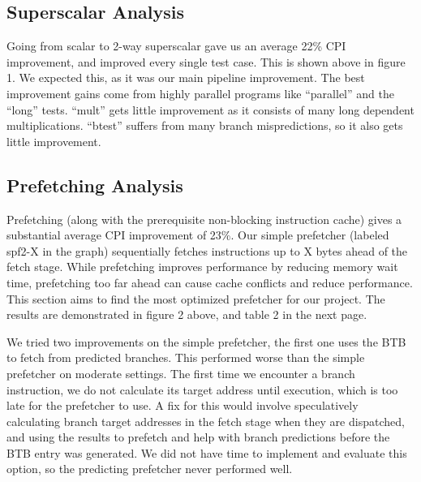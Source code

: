 \documentclass[10pt,journal,compsoc]{IEEEtran}
\begin{document}
\subsection{Superscalar Analysis}
Going from scalar to 2-way superscalar gave us an average 22\% CPI improvement, and improved every single test case. This is shown above in figure 1. We expected this, as it was our main pipeline improvement. The best improvement gains come from highly parallel programs like ``parallel'' and the ``long'' tests. ``mult'' gets little improvement as it consists of many long dependent multiplications. ``btest'' suffers from many branch mispredictions, so it also gets little improvement.

\subsection{Prefetching Analysis}

Prefetching (along with the prerequisite non-blocking instruction cache) gives a substantial average CPI improvement of 23\%. Our simple prefetcher (labeled spf2-X in the graph) sequentially fetches instructions up to X bytes ahead of the fetch stage. While prefetching improves performance by reducing memory wait time, prefetching too far ahead can cause cache conflicts and reduce performance. This section aims to find the most optimized prefetcher for our project. The results are demonstrated in figure 2 above, and table 2 in the next page.

We tried two improvements on the simple prefetcher, the first one uses the BTB to fetch from predicted branches. This performed worse than the simple prefetcher on moderate settings. The first time we encounter a branch instruction, we do not calculate its target address until execution, which is too late for the prefetcher to use. A fix for this would involve speculatively calculating branch target addresses in the fetch stage when they are dispatched, and using the results to prefetch and help with branch predictions before the BTB entry was generated. We did not have time to implement and evaluate this option, so the predicting prefetcher never performed well.
\end{document}
